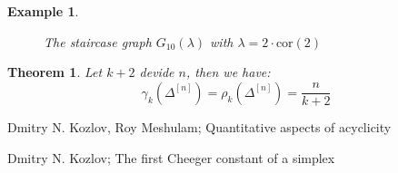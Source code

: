 \documentclass{article}
\newtheorem{thm}{Theorem}[section]
\newtheorem{expl}{Example}[section]
\begin{document}
\begin{expl}
\begin{figure}[ht]
  \caption{The staircase graph $G_{10}(\lambda)$ with $\lambda=2\cdot\text{cor}(2)$}
  \label{figure1:Figure 1}
\end{figure}

\end{expl}

\begin{thm}
Let \(k+2\) devide \(n\), then we have:
\[
\gamma_k(\Delta^{[n]})=\rho_k(\Delta^{[n]})=\frac{n}{k+2}
\]
\end{thm}

\begin{thebibliography}{9}

 Dmitry N. Kozlov, Roy Meshulam; Quantitative aspects of acyclicity

 Dmitry N. Kozlov; The first Cheeger constant of a simplex

\end{thebibliography}
\end{document}
